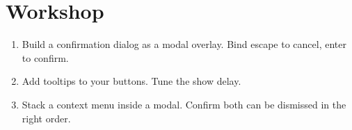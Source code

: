 \section*{Workshop}

\begin{enumerate}[leftmargin=*]
  \item Build a confirmation dialog as a modal overlay.
    Bind escape to cancel, enter to confirm.
  \item Add tooltips to your buttons. Tune the show delay.
  \item Stack a context menu inside a modal. Confirm both
    can be dismissed in the right order.
\end{enumerate}
